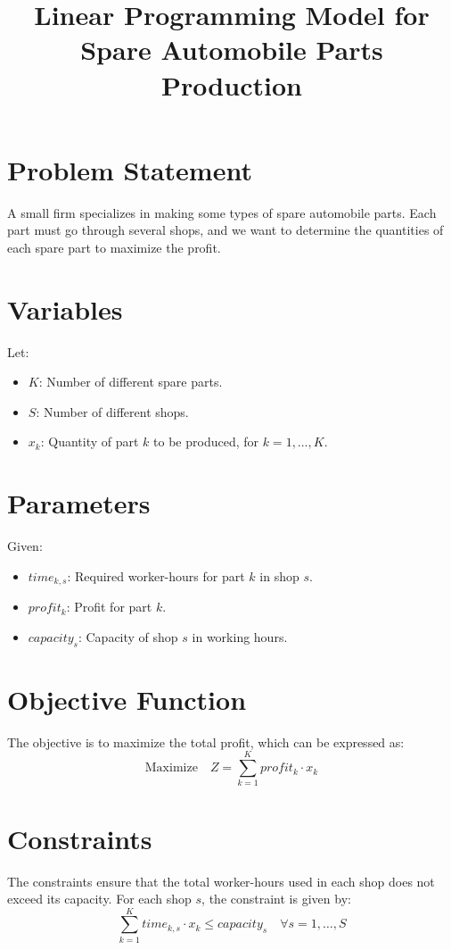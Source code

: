 \documentclass{article}
\begin{document}
\title{Linear Programming Model for Spare Automobile Parts Production}
\author{}
\date{}
\maketitle

\section*{Problem Statement}
A small firm specializes in making some types of spare automobile parts. Each part must go through several shops, and we want to determine the quantities of each spare part to maximize the profit.

\section*{Variables}
Let:
\begin{itemize}
    \item \( K \): Number of different spare parts.
    \item \( S \): Number of different shops.
    \item \( x_k \): Quantity of part \( k \) to be produced, for \( k = 1, \ldots, K \).
\end{itemize}

\section*{Parameters}
Given:
\begin{itemize}
    \item \( time_{k,s} \): Required worker-hours for part \( k \) in shop \( s \).
    \item \( profit_k \): Profit for part \( k \).
    \item \( capacity_s \): Capacity of shop \( s \) in working hours.
\end{itemize}

\section*{Objective Function}
The objective is to maximize the total profit, which can be expressed as:
\[
\text{Maximize} \quad Z = \sum_{k=1}^{K} profit_k \cdot x_k
\]

\section*{Constraints}
The constraints ensure that the total worker-hours used in each shop does not exceed its capacity. For each shop \( s \), the constraint is given by:
\[
\sum_{k=1}^{K} time_{k,s} \cdot x_k \leq capacity_s \quad \forall s = 1, \ldots, S
\]
\end{document}
